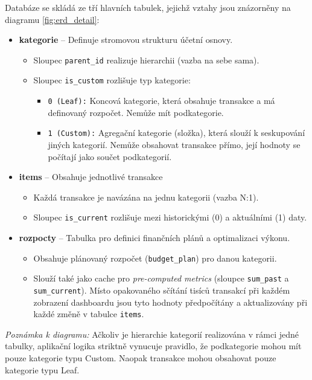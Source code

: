 \documentclass[
program=itk,
biblatex,
language=czech,
font=sans,
figures=true,
tables=false,
sourcecodes=false,
glossaries,
index
]{kidiplom}
\begin{document}
Databáze se skládá ze tří hlavních tabulek, jejichž vztahy jsou znázorněny na diagramu \ref{fig:erd_detail}:

\begin{itemize}
    \item \textbf{kategorie} – Definuje stromovou strukturu účetní osnovy.
    \begin{itemize}
        \item Sloupec \texttt{parent\_id} realizuje hierarchii (vazba na sebe sama).
        \item Sloupec \texttt{is\_custom} rozlišuje typ kategorie:
        \begin{itemize}
            \item \texttt{0 (Leaf):} Koncová kategorie, která obsahuje transakce a má definovaný rozpočet. Nemůže mít podkategorie.
            \item \texttt{1 (Custom):} Agregační kategorie (složka), která slouží k seskupování jiných kategorií. Nemůže obsahovat transakce přímo, její hodnoty se počítají jako součet podkategorií.
        \end{itemize}
    \end{itemize}
    
    \item \textbf{items} – Obsahuje jednotlivé transakce
    \begin{itemize}
        \item Každá transakce je navázána na jednu kategorii (vazba N:1).
        \item Sloupec \texttt{is\_current} rozlišuje mezi historickými (0) a aktuálními (1) daty.
    \end{itemize}
    
    \item \textbf{rozpocty} – Tabulka pro definici finančních plánů a optimalizaci výkonu.
    \begin{itemize}
        \item Obsahuje plánovaný rozpočet (\texttt{budget\_plan}) pro danou kategorii.
        \item Slouží také jako cache pro \textit{pre-computed metrics} (sloupce \texttt{sum\_past} a \texttt{sum\_current}). Místo opakovaného sčítání tisíců transakcí při každém zobrazení dashboardu jsou tyto hodnoty předpočítány a aktualizovány při každé změně v tabulce \texttt{items}.
    \end{itemize}
\end{itemize}

\textit{Poznámka k diagramu:} Ačkoliv je hierarchie kategorií realizována v rámci jedné tabulky, aplikační logika striktně vynucuje pravidlo, že podkategorie mohou mít pouze kategorie typu Custom. Naopak transakce mohou obsahovat pouze kategorie typu Leaf.
\end{document}
